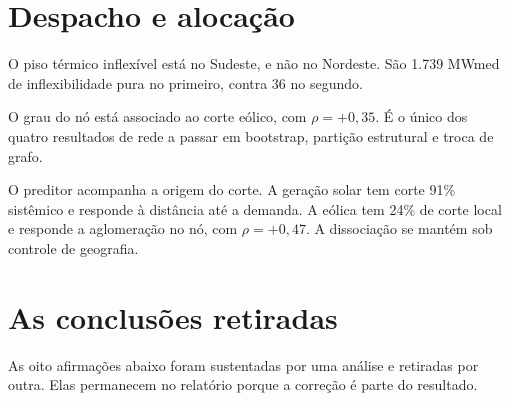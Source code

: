 \section{Despacho e alocação}

O piso térmico inflexível está no Sudeste, e não no Nordeste. São 1.739 MWmed
de inflexibilidade pura no primeiro, contra 36 no segundo.

O grau do nó está associado ao corte eólico, com $\rho = +0{,}35$. É o único dos
quatro resultados de rede a passar em bootstrap, partição estrutural e troca de
grafo.

O preditor acompanha a origem do corte. A geração solar tem corte 91\% sistêmico
e responde à distância até a demanda. A eólica tem 24\% de corte local e responde
a aglomeração no nó, com $\rho = +0{,}47$. A dissociação se mantém sob controle
de geografia.

\section{As conclusões retiradas}

As oito afirmações abaixo foram sustentadas por uma análise e retiradas por
outra. Elas permanecem no relatório porque a correção é parte do resultado.

